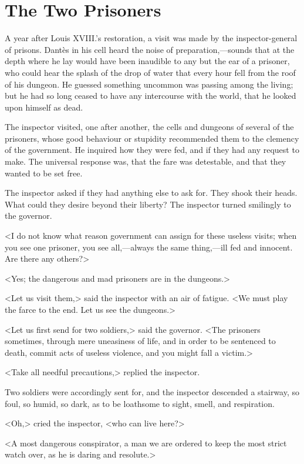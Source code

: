 \chapter{The Two Prisoners} 
	
	\lettrine{A}{} year after Louis XVIII.'s restoration, a visit was made by the inspector-general of prisons. Dantès in his cell heard the noise of preparation,—sounds that at the depth where he lay would have been inaudible to any but the ear of a prisoner, who could hear the splash of the drop of water that every hour fell from the roof of his dungeon. He guessed something uncommon was passing among the living; but he had so long ceased to have any intercourse with the world, that he looked upon himself as dead. 

 The inspector visited, one after another, the cells and dungeons of several of the prisoners, whose good behaviour or stupidity recommended them to the clemency of the government. He inquired how they were fed, and if they had any request to make. The universal response was, that the fare was detestable, and that they wanted to be set free. 

 The inspector asked if they had anything else to ask for. They shook their heads. What could they desire beyond their liberty? The inspector turned smilingly to the governor. 

 <I do not know what reason government can assign for these useless visits; when you see one prisoner, you see all,—always the same thing,—ill fed and innocent. Are there any others?> 

 <Yes; the dangerous and mad prisoners are in the dungeons.> 

 <Let us visit them,> said the inspector with an air of fatigue. <We must play the farce to the end. Let us see the dungeons.> 

 <Let us first send for two soldiers,> said the governor. <The prisoners sometimes, through mere uneasiness of life, and in order to be sentenced to death, commit acts of useless violence, and you might fall a victim.> 

 <Take all needful precautions,> replied the inspector. 

 Two soldiers were accordingly sent for, and the inspector descended a stairway, so foul, so humid, so dark, as to be loathsome to sight, smell, and respiration. 

 <Oh,> cried the inspector, <who can live here?> 

 <A most dangerous conspirator, a man we are ordered to keep the most strict watch over, as he is daring and resolute.> 

